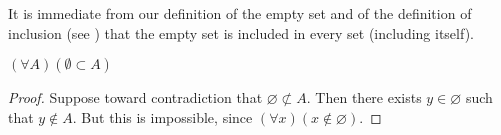 
It is immediate from our definition of the empty set and of the definition of inclusion (see ) that the empty set is included in every set (including itself).

\begin{proposition}
	$(\forall A)(\emptyset \subset A)$
\end{proposition}
\begin{proof}
	Suppose toward contradiction that $\varnothing \not\subset A$.
	Then there exists $y \in \varnothing$ such that $y \not \in A$.
	But this is impossible, since $(\forall x)(x \not \in \varnothing)$.
\end{proof}